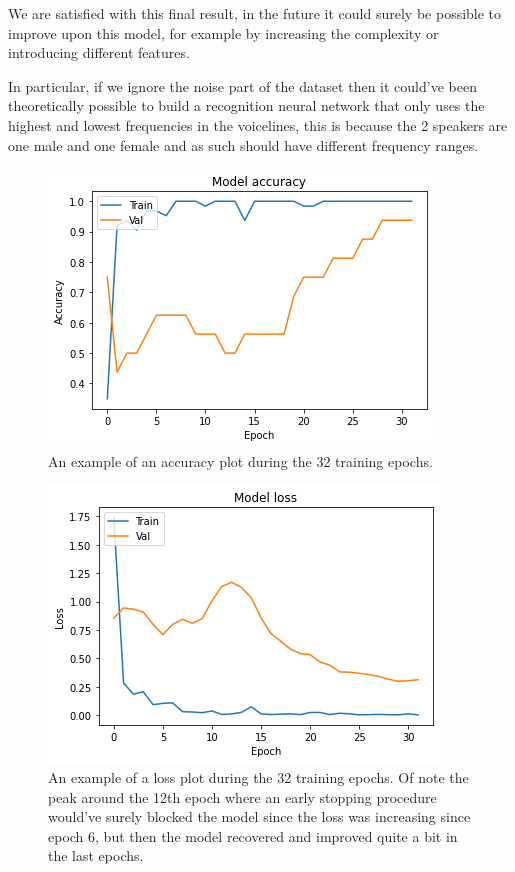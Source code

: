 \documentclass{article}
\begin{document}
	\bigskip
	We are satisfied with this final result, in the future it could surely be possible to improve upon this model, for example by increasing the complexity
	or introducing different features.

	In particular, if we ignore the noise part of the dataset then it could've been theoretically possible to build a recognition neural network that only uses the
	highest and lowest frequencies in the voicelines, this is because the 2 speakers are one male and one female and as such should have different frequency
	ranges.

	\begin{figure}
	\centering
	\includegraphics[width = \textwidth]{acc}
	\caption{An example of an accuracy plot during the 32 training epochs.}
	\label{fig:acc}
	\end{figure}

	\begin{figure}
	\centering
	\includegraphics[width = \textwidth]{loss}
	\caption{An example of a loss plot during the 32 training epochs. Of note the peak around the 12th epoch where an early stopping procedure would've 
		     surely blocked the model since the loss was increasing since epoch 6, but then the model recovered and improved quite a bit in the last epochs.}
	\end{figure}
\end{document}
